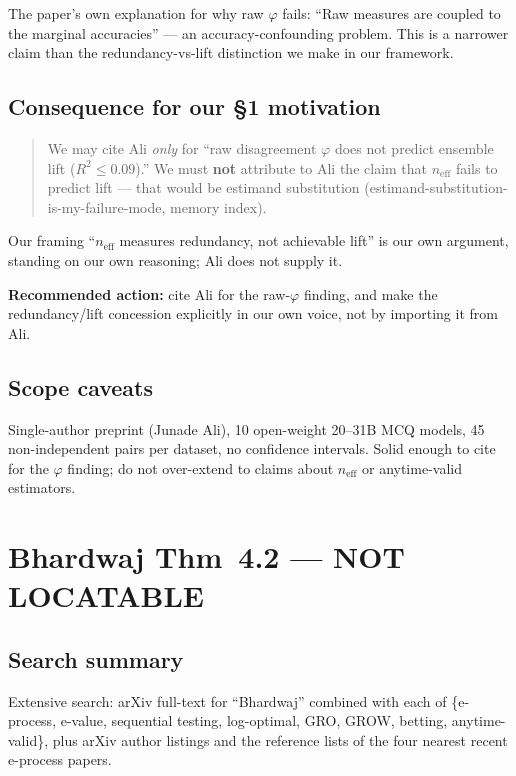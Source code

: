 \documentclass[11pt,a4paper]{article}
\begin{document}
The paper's own explanation for why raw $\varphi$ fails: ``Raw measures are coupled
to the marginal accuracies'' --- an accuracy-confounding problem.  This is a narrower
claim than the redundancy-vs-lift distinction we make in our framework.

\subsection*{Consequence for our \S1 motivation}

\begin{quote}
\color{darkred}
We may cite Ali \emph{only} for ``raw disagreement $\varphi$ does not predict ensemble
lift ($R^2 \leq 0.09$).''  We must \textbf{not} attribute to Ali the claim that
$n_{\mathrm{eff}}$ fails to predict lift --- that would be estimand substitution
(estimand-substitution-is-my-failure-mode, memory index).
\end{quote}

Our framing ``$n_{\mathrm{eff}}$ measures redundancy, not achievable lift'' is our own
argument, standing on our own reasoning; Ali does not supply it.

\textbf{Recommended action:} cite Ali for the raw-$\varphi$ finding, and make the
redundancy/lift concession explicitly in our own voice, not by importing it from Ali.

\subsection*{Scope caveats}

Single-author preprint (Junade Ali), 10 open-weight 20--31B MCQ models, 45
non-independent pairs per dataset, no confidence intervals.  Solid enough to cite for
the $\varphi$ finding; do not over-extend to claims about $n_{\mathrm{eff}}$ or
anytime-valid estimators.

\section{Bhardwaj Thm~4.2 --- NOT LOCATABLE}

\subsection*{Search summary}

Extensive search: arXiv full-text for ``Bhardwaj'' combined with each of
\{e-process, e-value, sequential testing, log-optimal, GRO, GROW, betting,
anytime-valid\}, plus arXiv author listings and the reference lists of the four
nearest recent e-process papers.
\end{document}
